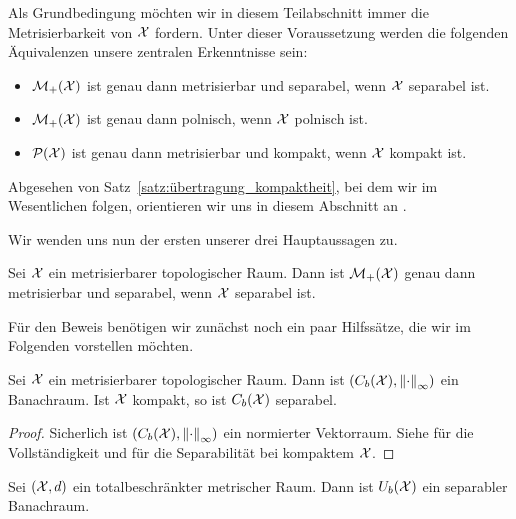 \documentclass[../main/main.tex]{subfiles}
\begin{document}
	Als Grundbedingung möchten wir in diesem Teilabschnitt immer die Metrisierbarkeit von $\mathcal{X}$ fordern.
	Unter dieser Voraussetzung werden die folgenden Äquivalenzen unsere zentralen Erkenntnisse sein:
	\vspace*{0.5em}
	\begin{itemize}
		\item $\mathcal{M}_{+}(\mathcal{X})$ ist genau dann metrisierbar und separabel, wenn $\mathcal{X}$ separabel ist.
		\item $\mathcal{M}_{+}(\mathcal{X})$ ist genau dann polnisch, wenn $\mathcal{X}$ polnisch ist.
		\item $\mathcal{P}(\mathcal{X})$ ist genau dann metrisierbar und kompakt, wenn $\mathcal{X}$ kompakt ist.
	\end{itemize}
	\vspace*{0.5em}
	Abgesehen von Satz~\ref{satz:übertragung_kompaktheit}, bei dem wir im Wesentlichen \cite{vanGaans.200203} folgen, orientieren wir uns in diesem Abschnitt an \cite{Varadarajan.1958}.
	
	Wir wenden uns nun der ersten unserer drei Hauptaussagen zu.
	
	\begin{Satz}
		\label{satz:übertragung_metrisierbarkeit_separabilität}
		Sei $\mathcal{X}$ ein metrisierbarer topologischer Raum. Dann ist $\mathcal{M}_{+}(\mathcal{X})$ genau dann metrisierbar und separabel, wenn $\mathcal{X}$ separabel ist.
	\end{Satz}

	Für den Beweis benötigen wir zunächst noch ein paar Hilfssätze, die wir im Folgenden vorstellen möchten.
	
	\begin{Hilfssatz}
		\label{hilfssatz:beschränkte_stetige_funktionen_banachraum}
		Sei $\mathcal{X}$ ein metrisierbarer topologischer Raum. Dann ist $(C_b(\mathcal{X}), \left\lVert\cdot\right\rVert_\infty)$ ein Banachraum. Ist $\mathcal{X}$ kompakt, so ist $C_b(\mathcal{X})$ separabel.
	\end{Hilfssatz}

	\begin{proof}
		Sicherlich ist $(C_b(\mathcal{X}), \left\lVert\cdot\right\rVert_\infty)$ ein normierter Vektorraum. Siehe \cite[Satz 2.1.6]{Simon.2015} für die Vollständigkeit und
		\cite[Satz 2.3.7]{Simon.2015} für die Separabilität bei kompaktem $\mathcal{X}$.
	\end{proof}
	
	\begin{Hilfssatz}
		\label{hilfssatz:beschränkte_glm_stetige_funktionen_banachraum}
		Sei $(\mathcal{X}, d)$ ein totalbeschränkter metrischer Raum. Dann ist $U_b(\mathcal{X})$ ein separabler Banachraum.
	\end{Hilfssatz}
	
\end{document}
